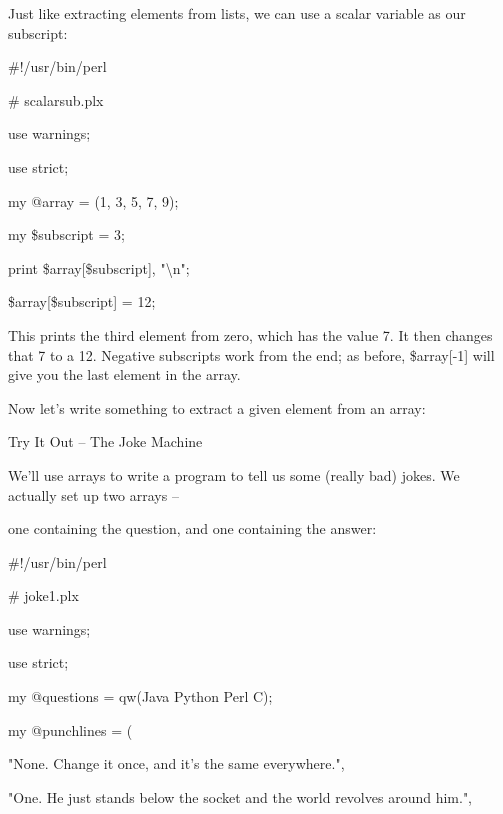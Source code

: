 \documentclass[a4paper,11pt]{book}
\begin{document}
\noindent 

\noindent 

\noindent Just like extracting elements from lists, we can use a scalar variable as our subscript:

\noindent 

\noindent \#!/usr/bin/perl

\noindent \# scalarsub.plx

\noindent use warnings;

\noindent use strict;

\noindent 

\noindent my @array = (1, 3, 5, 7, 9);

\noindent my \$subscript = 3;

\noindent print \$array[\$subscript], "\textbackslash n";

\noindent \$array[\$subscript] = 12;

\noindent 

\noindent This prints the third element from zero, which has the value 7. It then changes that 7 to a 12. Negative subscripts work from the end; as before, \$array[-1] will give you the last element in the array.

\noindent 

\noindent 

\noindent Now let's write something to extract a given element from an array:

\noindent 

\noindent Try It Out -- The Joke Machine

\noindent 

\noindent We'll use arrays to write a program to tell us some (really bad) jokes. We actually set up two arrays --

\noindent one containing the question, and one containing the answer:

\noindent 

\noindent \#!/usr/bin/perl

\noindent \# joke1.plx

\noindent use warnings;

\noindent use strict;

\noindent 

\noindent my @questions = qw(Java Python Perl C);

\noindent my @punchlines = (

\noindent "None. Change it once, and it's the same everywhere.",

\noindent "One. He just stands below the socket and the world revolves around him.",
\end{document}
